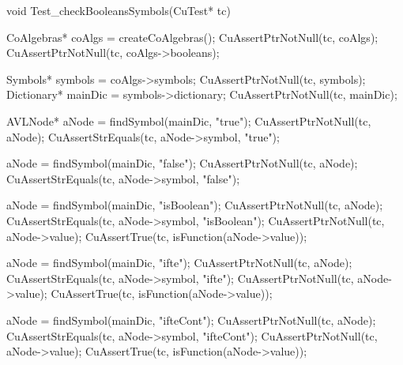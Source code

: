 void Test_checkBooleansSymbols(CuTest* tc) {
  CoAlgebras* coAlgs = createCoAlgebras();
  CuAssertPtrNotNull(tc, coAlgs);
  CuAssertPtrNotNull(tc, coAlgs->booleans);

  Symbols* symbols = coAlgs->symbols;
  CuAssertPtrNotNull(tc, symbols);
  Dictionary* mainDic = symbols->dictionary;
  CuAssertPtrNotNull(tc, mainDic);

  AVLNode* aNode = findSymbol(mainDic, "true");
  CuAssertPtrNotNull(tc, aNode);
  CuAssertStrEquals(tc, aNode->symbol, "true");

  aNode = findSymbol(mainDic, "false");
  CuAssertPtrNotNull(tc, aNode);
  CuAssertStrEquals(tc, aNode->symbol, "false");

  aNode = findSymbol(mainDic, "isBoolean");
  CuAssertPtrNotNull(tc, aNode);
  CuAssertStrEquals(tc, aNode->symbol, "isBoolean");
  CuAssertPtrNotNull(tc, aNode->value);
  CuAssertTrue(tc, isFunction(aNode->value));

  aNode = findSymbol(mainDic, "ifte");
  CuAssertPtrNotNull(tc, aNode);
  CuAssertStrEquals(tc, aNode->symbol, "ifte");
  CuAssertPtrNotNull(tc, aNode->value);
  CuAssertTrue(tc, isFunction(aNode->value));

  aNode = findSymbol(mainDic, "ifteCont");
  CuAssertPtrNotNull(tc, aNode);
  CuAssertStrEquals(tc, aNode->symbol, "ifteCont");
  CuAssertPtrNotNull(tc, aNode->value);
  CuAssertTrue(tc, isFunction(aNode->value));
}

\stoptyping

\stopJoyLoLWord